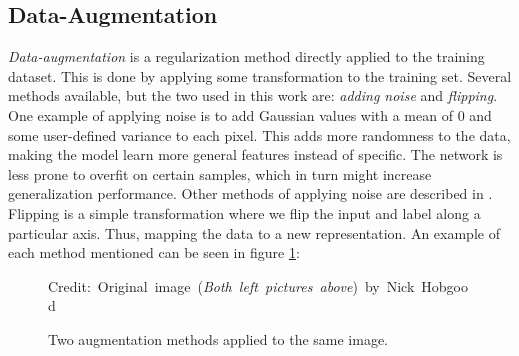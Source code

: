 \subsection{Data-Augmentation} \label{data-augmentation}
     \textit{Data-augmentation} is a regularization method directly applied to the training dataset\cite{kukavcka2017_regularization}. This is done by applying some transformation to the training set. Several methods available, but the two used in this work are: \textit{adding noise} and \textit{flipping}. One example of applying noise is to add Gaussian values with a mean of 0 and some user-defined variance to each pixel. This adds more randomness to the data, making the model learn more general features instead of specific. The network is less prone to overfit on certain samples, which in turn might increase generalization performance. Other methods of applying noise are described in \citeauthor{kukavcka2017_regularization}\cite{kukavcka2017_regularization}. Flipping is a simple transformation where we flip the input and label along a particular axis. Thus, mapping the data to a new representation. An example of each method mentioned can be seen in figure \ref{data augmentation fig}:
    \begin{figure}[H]
        \centering
        
        
        
        
        \caption[Two data augmentation examples]{Two augmentation methods applied to the same image.}
        \medskip 
        \hspace*{15pt}\hbox{\scriptsize Credit: Original image (\textit{Both left pictures above}) by Nick Hobgood\cite{clownfish_image}}
        \label{data augmentation fig}
        
        \end{figure}
    

